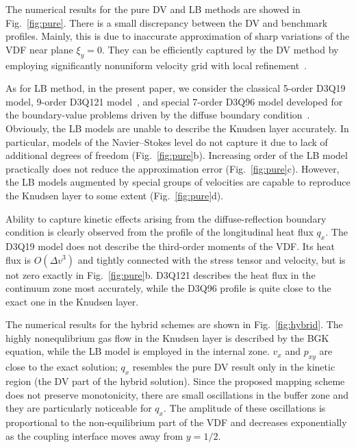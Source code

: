 \documentclass{aip-cp}
\newcommand{\OO}[1]{O(#1)}
\begin{document}
The numerical results for the pure DV and LB methods are showed in Fig.~\ref{fig:pure}.
There is a small discrepancy between the DV and benchmark profiles.
Mainly, this is due to inaccurate approximation of sharp variations of the VDF near plane \(\xi_y=0\).
They can be efficiently captured by the DV method by employing significantly nonuniform velocity grid
with local refinement~\cite{Ohwada1990, Rogozin2016}.

As for LB method, in the present paper, we consider the classical 5-order D3Q19 model, 9-order D3Q121 model~\cite{Shan2010},
and special 7-order D3Q96 model developed for the boundary-value problems driven by the diffuse boundary condition~\cite{Feuchter2016}.
Obviously, the LB models are unable to describe the Knudsen layer accurately.
In particular, models of the Navier--Stokes level do not capture it due to lack of additional degrees of freedom (Fig.~\ref{fig:pure}b).
Increasing order of the LB model practically does not reduce the approximation error (Fig.~\ref{fig:pure}c).
However, the LB models augmented by special groups of velocities are capable to reproduce the Knudsen layer to some extent (Fig.~\ref{fig:pure}d).

Ability to capture kinetic effects arising from the diffuse-reflection boundary condition
is clearly observed from the profile of the longitudinal heat flux \(q_x\).
The D3Q19 model does not describe the third-order moments of the VDF.
Its heat flux is \(\OO{\Delta v^3}\) and tightly connected with the stress tensor and velocity, but is not zero exactly in Fig.~\ref{fig:pure}b.
D3Q121 describes the heat flux in the continuum zone most accurately, while the D3Q96 profile is quite close to the exact one in the Knudsen layer.

The numerical results for the hybrid schemes are shown in Fig.~\ref{fig:hybrid}.
The highly nonequlibrium gas flow in the Knudsen layer is described by the BGK equation,
while the LB model is employed in the internal zone.
\(v_x\) and \(p_{xy}\) are close to the exact solution;
\(q_x\) resembles the pure DV result only in the kinetic region (the DV part of the hybrid solution).
Since the proposed mapping scheme does not preserve monotonicity,
there are small oscillations in the buffer zone and they are particularly noticeable for \(q_x\).
The amplitude of these oscillations is proportional to the non-equilibrium part of the VDF
and decreases exponentially as the coupling interface moves away from \(y=1/2\).
\end{document}
